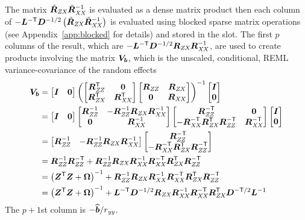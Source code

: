 \documentclass[12pt]{article}
\begin{document}
The matrix $\tilde{\bm{R}}_\mathit{ZX}{\tilde{\bm{R}}_\mathit{XX}}^{-1}$ is evaluated as a dense matrix product
then each column of
$-\bm{L}^{-\mathsf{T}}\bm{D}^{-1/2}\left(\tilde{\bm{R}}_\mathit{ZX}{\tilde{\bm{R}}_\mathit{XX}}^{-1}\right)$ is evaluated
using blocked sparse matrix operations (see Appendix~\ref{app:blocked}
for details) and stored in the  slot.  The first $p$ columns
of the result, which are $-\bm{L}^{-\mathsf{T}}\bm{D}^{-1/2}\bm{R}_\mathit{ZX}\bm{R}_\mathit{XX}^{-1}$, are
used to create products involving the matrix $\bm{V}_{\bm{b}}$, which is the
unscaled, conditional, REML variance-covariance of the random effects
\begin{equation}
  \label{eq:VbDef}
  \begin{aligned}
    \vb&= \begin{bmatrix}\bI&\bzer\end{bmatrix}
    \left(
      \begin{bmatrix}\RZZ\trans & \bzer \\ \RZX\trans & \RXX\trans\end{bmatrix}
      \begin{bmatrix}\RZZ & \RZX \\ \bzer & \RXX\end{bmatrix}
    \right)^{-1}
    \begin{bmatrix} \bI\\\bzer \end{bmatrix}\\
    &= \begin{bmatrix}\bI&\bzer\end{bmatrix}
    \begin{bmatrix}\RZZ\inv&-\RZZ\inv\RZX\RXX\inv\\\bzer&\RXX\inv\end{bmatrix}
    \begin{bmatrix}\RZZ\invtrans&\bzer\\
      -\RXX\invtrans\RZX\trans\RZZ\invtrans&\RXX\invtrans\end{bmatrix}
    \begin{bmatrix} \bI\\\bzer \end{bmatrix}\\
    &=\begin{bmatrix}\RZZ\inv&-\RZZ\inv\RZX\RXX\inv\end{bmatrix}    
    \begin{bmatrix}\RZZ\invtrans\\
      -\RXX\invtrans\RZX\trans\RZZ\invtrans\end{bmatrix}\\
    &=\RZZ\inv\RZZ\invtrans
    +\RZZ\inv\RZX\RXX\inv\RXX\invtrans\RZX\trans\RZZ\invtrans\\
    &=\left(\bZ\trans\bZ+\bOmega\right)\inv
    +\RZZ\inv\RZX\RXX\inv\RXX\invtrans\RZX\trans\RZZ\invtrans\\
    &=\left(\bZ\trans\bZ+\bOmega\right)\inv
    +\bL\invtrans\bD^{-1/2}\RZX\RXX\inv
    \RXX\invtrans\RZX\trans\bD^{-\mathsf{T}/2}\bL\inv\\
  \end{aligned}
\end{equation}
The $p+1$st column is $-\widehat{\bm{b}}/r_\mathit{yy}$.
\end{document}
